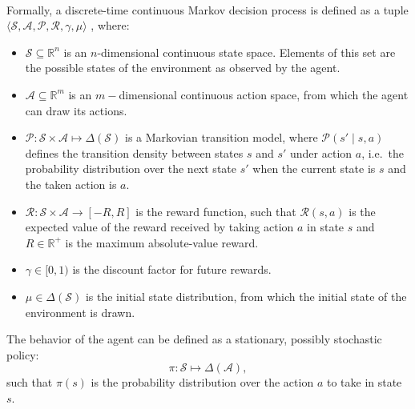 \paragraph{} %
Formally, a discrete-time continuous Markov decision process is defined as a tuple
$\langle \mathcal{S},\mathcal{A},\mathcal{P},\mathcal{R},\gamma,\mu \rangle$
, where:
\begin{itemize}
\item $\mathcal{S} \subseteq \mathbb{R}^n$ is an $n$-dimensional continuous state space. Elements of this set are the possible states of the environment as observed by the agent.
\item $\mathcal{A}\subseteq \mathbb{R}^m$ is an $m-$dimensional continuous action space, from which the agent can draw its actions.
\item  $\mathcal{P} \colon \mathcal{S}\times\mathcal{A} \mapsto \Delta(\mathcal{S}) $ is a Markovian transition model, where $\mathcal{P}(s'\mid s,a)$ defines the transition density between states $s$ and $s'$ under action $a$, i.e.\ the probability distribution over the next state $s'$ when the current state is $s$ and the taken action is $a$.
\item $\mathcal{R}:\mathcal{S} \times \mathcal{A} \rightarrow [-R,R]$ is the reward function, such that $\mathcal{R}(s,a)$ is the expected value of the reward received by taking action $a$ in state $s$ and $R \in \mathbb{R^+}$ is the maximum absolute-value reward.
\item $\gamma \in [0,1)$ is the discount factor for future rewards.
\item $\mu \in \Delta(\mathcal{S})$ is the initial state distribution, from which the initial state of the environment is drawn.
\end{itemize}
The behavior of the agent can be defined as a stationary, possibly stochastic policy:
 \[
 	\pi \colon \mathcal{S}\mapsto\Delta(\mathcal{A}),
 \] 
 such that $\pi(s)$ is the probability distribution over the action $a$ to take in state $s$. 

